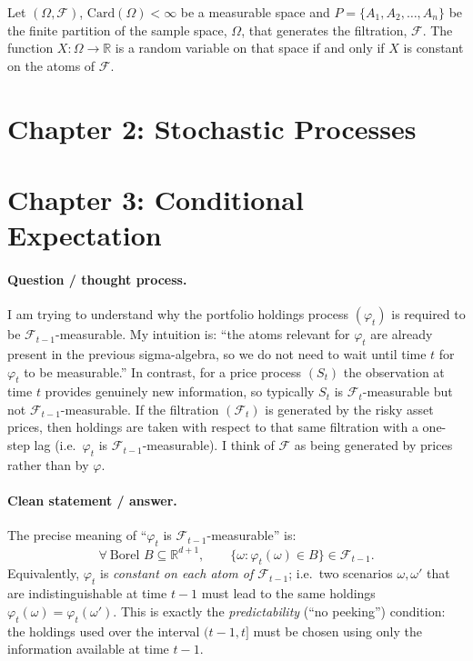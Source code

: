 \documentclass[11pt]{article}
\begin{document}
Let $(\Omega, \mathcal{F})$, $\text{Card}(\Omega) < \infty$ be a measurable space and $P = \{A_1, A_2, \ldots, A_n \}$ be the finite partition of the sample space, $\Omega$, that generates the filtration, $\mathcal{F}$. The function $X: \Omega \rightarrow \mathbb{R}$ is a random variable on that space if and only if $X$ is constant on the atoms of $\mathcal{F}$.

\section{Chapter 2: Stochastic Processes}

\section{Chapter 3: Conditional Expectation}

\paragraph{Question / thought process.}
I am trying to understand why the portfolio holdings process $(\varphi_t)$ is required to be $\mathcal F_{t-1}$-measurable. 
My intuition is:
``the atoms relevant for $\varphi_t$ are already present in the previous sigma-algebra, so we do not need to wait until time $t$ for $\varphi_t$ to be measurable.'' 
In contrast, for a price process $(S_t)$ the observation at time $t$ provides genuinely new information, so typically $S_t$ is $\mathcal F_t$-measurable but not $\mathcal F_{t-1}$-measurable. 
If the filtration $(\mathcal F_t)$ is generated by the risky asset prices, then holdings are taken with respect to that same filtration with a one-step lag (i.e.\ $\varphi_t$ is $\mathcal F_{t-1}$-measurable). 
I think of $\mathcal F$ as being generated by prices rather than by $\varphi$.

\paragraph{Clean statement / answer.}
The precise meaning of ``$\varphi_t$ is $\mathcal F_{t-1}$-measurable'' is:
\[
\forall\ \text{Borel }B\subseteq \mathbb R^{d+1},\qquad
\{\omega:\varphi_t(\omega)\in B\}\in \mathcal F_{t-1}.
\]
Equivalently, $\varphi_t$ is \emph{constant on each atom of $\mathcal F_{t-1}$}; i.e.\ two scenarios $\omega,\omega'$ that are indistinguishable at time $t-1$ must lead to the same holdings $\varphi_t(\omega)=\varphi_t(\omega')$.
This is exactly the \emph{predictability} (``no peeking'') condition: the holdings used over the interval $(t-1,t]$ must be chosen using only the information available at time $t-1$.
\end{document}

